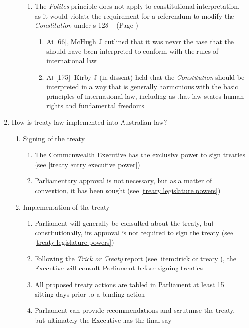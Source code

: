 \begin{enumerate}
\begin{enumerate}
\begin{enumerate}
            \item The \textit{Polites} principle does not apply to constitutional interpretation, as it would violate the requirement for a referendum to modify the \textit{Constitution} under s 128 --  (Page \pageref{case:Al-Kateb v Godwin})
            \begin{enumerate}
                \item At [66], McHugh J outlined that it was never the case that the  should have been interpreted to conform with the rules of international law
                \item At [175], Kirby J (in dissent) held that the \textit{Constitution} should be interpreted in a way that is generally harmonious with the basic principles of international law, including as that law states human rights and fundamental freedoms
            \end{enumerate}
        \end{enumerate}
    \end{enumerate}
    \item How is treaty law implemented into Australian law?
    \begin{enumerate}
        \item Signing of the treaty
        \begin{enumerate}
            \item The Commonwealth Executive has the exclusive power to sign treaties (see \ref{treaty entry executive power})
            \item Parliamentary approval is not necessary, but as a matter of convention, it has been sought (see \ref{treaty legislature powers})
        \end{enumerate}
        \item Implementation of the treaty
        \begin{enumerate}
            \item Parliament will generally be consulted about the treaty, but constitutionally, its approval is not required to sign the treaty (see \ref{treaty legislature powers})
            \item Following the \textit{Trick or Treaty} report (see \ref{item:trick or treaty}), the Executive will consult Parliament before signing treaties
            \item All proposed treaty actions are tabled in Parliament at least 15 sitting days prior to a binding action
            \item Parliament can provide recommendations and scrutinise the treaty, but ultimately the Executive has the final say

\end{enumerate}
\end{enumerate}
\end{enumerate}

